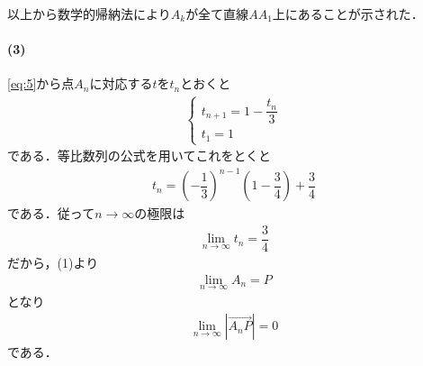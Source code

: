 \documentclass[../../main.tex]{subfiles}
\begin{document}
以上から数学的帰納法により$A_k$が全て直線$AA_1$上にあることが示された．

\paragraph{(3)}

\cref{eq:5}から点$A_n$に対応する$t$を$t_n$とおくと
\begin{align}
  \begin{cases}
    t_{n+1} = 1 - \dfrac{t_n}{3} \\
    t_1 = 1
  \end{cases}
\end{align}
である．等比数列の公式を用いてこれをとくと
\begin{align}
  t_n = \left(-\dfrac{1}{3}\right)^{n-1} \left(1-\dfrac{3}{4}\right) + \dfrac{3}{4}
\end{align}
である．従って$n\to\infty$の極限は
\begin{align}
  \lim_{n\to\infty} t_n = \dfrac{3}{4}
\end{align}
だから，(1)より
\begin{align}
  \lim_{n\to\infty}A_n = P
\end{align}
となり
\begin{align}
  \lim_{n \to \infty} |\overrightarrow{A_n P}| = 0
\end{align}
である．
\end{document}
